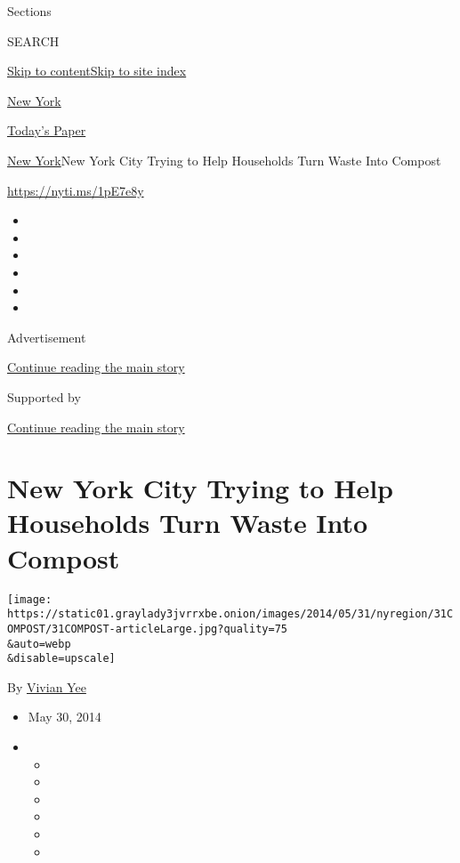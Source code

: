 Sections

SEARCH

\protect\hyperlink{site-content}{Skip to
content}\protect\hyperlink{site-index}{Skip to site index}

\href{https://www.nytimes3xbfgragh.onion/section/nyregion}{New York}

\href{https://myaccount.nytimes3xbfgragh.onion/auth/login?response_type=cookie\&client_id=vi}{}

\href{https://www.nytimes3xbfgragh.onion/section/todayspaper}{Today's
Paper}

\href{/section/nyregion}{New York}\textbar{}New York City Trying to Help
Households Turn Waste Into Compost

\url{https://nyti.ms/1pE7e8y}

\begin{itemize}
\item
\item
\item
\item
\item
\item
\end{itemize}

Advertisement

\protect\hyperlink{after-top}{Continue reading the main story}

Supported by

\protect\hyperlink{after-sponsor}{Continue reading the main story}

\hypertarget{new-york-city-trying-to-help-households-turn-waste-into-compost}{%
\section{New York City Trying to Help Households Turn Waste Into
Compost}\label{new-york-city-trying-to-help-households-turn-waste-into-compost}}

\texttt{[image: https://static01.graylady3jvrrxbe.onion/images/2014/05/31/nyregion/31COMPOST/31COMPOST-articleLarge.jpg?quality=75\\\&auto=webp\\\&disable=upscale]}

By \href{http://www.nytimes3xbfgragh.onion/by/vivian-yee}{Vivian Yee}

\begin{itemize}
\item
  May 30, 2014
\item
  \begin{itemize}
  \item
  \item
  \item
  \item
  \item
  \item
  \end{itemize}
\end{itemize}

